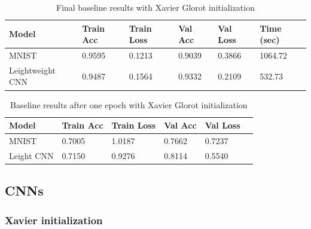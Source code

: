\documentclass{article}
\theoremstyle{definition}
\theoremstyle{remark}
\begin{document}
\begin{table}[h!]
\center
\begin{tabular}{|l|l|l|l|l|l|}
\hline
\textbf{Model} & \textbf{Train Acc} & \textbf{Train Loss} & \textbf{Val Acc} & \textbf{Val Loss} & \textbf{Time (sec)}\\ \hline
MNIST		    & 0.9595 		 & 0.1213      & 0.9039		  & 0.3866	 &	1064.72\\ \hline
Leightweight CNN    & 0.9487   	 & 0.1564 	   & 0.9332		  &	0.2109	 &  532.73 \\ \hline
\end{tabular}
\caption{Final baseline results with Xavier Glorot initialization}
\label{tab:final_baseline_results_xavier}
\end{table}


\begin{table}[h!]
\center
\begin{tabular}{|l|l|l|l|l|l|}
\hline
\textbf{Model} & \textbf{Train Acc} & \textbf{Train Loss} & \textbf{Val Acc} & \textbf{Val Loss}\\ \hline
MNIST		  & 0.7005  & 1.0187   & 0.7662 & 0.7237 \\ \hline
Leight CNN    & 0.7150  & 0.9276  & 0.8114  &	0.5540 \\ \hline
\end{tabular}
\caption{Baseline results after one epoch with Xavier Glorot initialization}
\label{tab:one_epoch_baseline_results_xavier}
\end{table}


\subsection{CNNs}




\subsubsection{Xavier initialization}
\end{document}
